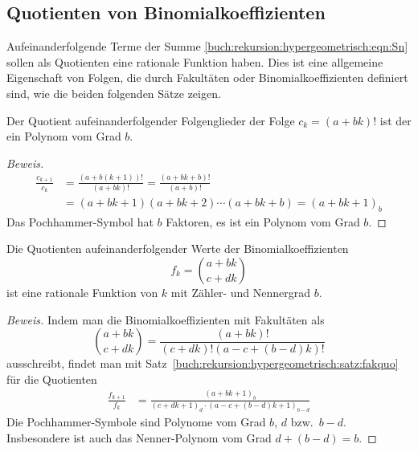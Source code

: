 %
%
\subsection{Quotienten von Binomialkoeffizienten
\label{buch:rekursion:hypergeometrisch:binomialkoeffizienten}}
Aufeinanderfolgende Terme der Summe
\eqref{buch:rekursion:hypergeometrisch:eqn:Sn}
sollen als Quotienten eine rationale Funktion haben.
Dies ist eine allgemeine Eigenschaft von Folgen, die durch Fakultäten
oder Binomialkoeffizienten definiert sind, wie die beiden folgenden
Sätze zeigen.

\begin{satz}
%
\label{buch:rekursion:hypergeometrisch:satz:fakquo}
Der Quotient aufeinanderfolgender Folgenglieder
der Folge $c_k=(a+bk)!$ ist der ein Polynom vom Grad $b$.
\end{satz}
\begin{proof}[Beweis]
\begin{align*}
\frac{c_{k+1}}{c_k}
&=
\frac{(a+b(k+1))!}{(a+bk)!}
=
\frac{(a+bk+b)!}{(a+b)!}
\\
&=
(a+bk+1)(a+bk+2)\cdots(a+bk+b)
=
(a+bk+1)_b
\end{align*}
Das Pochhammer-Symbol hat $b$ Faktoren, es ist ein Polynom vom Grad $b$.
\end{proof}
%

\begin{satz}
%
\label{buch:rekursion:hypergeometrisch:satz:binomquo}
Die Quotienten aufeinanderfolgender Werte der Binomialkoeffizienten
\[
f_k
=
\binom{a+bk}{c+dk}
\]
ist eine rationale Funktion von $k$ mit Zähler- und Nennergrad $b$.
\end{satz}

\begin{proof}[Beweis]
Indem man die Binomialkoeffizienten mit Fakultäten als
\[
\binom{a+bk}{c+dk}
=
\frac{(a+bk)!}{(c+dk)!(a-c+(b-d)k)!}
\]
ausschreibt, findet man mit
Satz~\ref{buch:rekursion:hypergeometrisch:satz:fakquo}
für die Quotienten
\begin{align}
\frac{f_{k+1}}{f_k}
&=
\frac{(a+bk+1)_b}{(c+dk+1)_d\cdot(a-c+(b-d)k+1)_{b-d}}
\label{buch:rekursion:eqn:binomquotient}
\end{align}
Die Pochhammer-Symbole sind Polynome vom Grad $b$, $d$ bzw.~$b-d$.
Insbesondere ist auch das Nenner-Polynom vom Grad $d+(b-d)=b$.
\end{proof}

